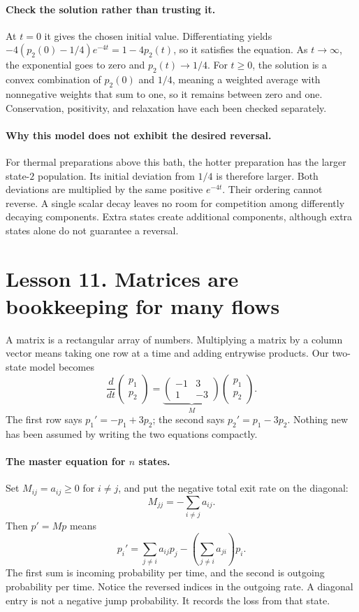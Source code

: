 \documentclass[11pt]{article}
\begin{document}
\paragraph{Check the solution rather than trusting it.}
At $t=0$ it gives the chosen initial value. Differentiating yields
$-4(p_2(0)-1/4)e^{-4t}=1-4p_2(t)$, so it satisfies the equation.
As $t\to\infty$, the exponential goes to zero and $p_2(t)\to1/4$.
For $t\geq0$, the solution is a convex combination of $p_2(0)$ and $1/4$,
meaning a weighted average with nonnegative weights that sum to one,
so it remains between zero and one. Conservation, positivity, and relaxation
have each been checked separately.

\paragraph{Why this model does not exhibit the desired reversal.}
For thermal preparations above this bath, the hotter preparation has the
larger state-$2$ population. Its initial deviation from $1/4$ is therefore
larger. Both deviations are multiplied by the same positive $e^{-4t}$.
Their ordering cannot reverse. A single scalar decay leaves no room for
competition among differently decaying components. Extra states create
additional components, although extra states alone do not guarantee a reversal.

\clearpage
\section*{Lesson 11. Matrices are bookkeeping for many flows}
A matrix is a rectangular array of numbers. Multiplying a matrix by a column
vector means taking one row at a time and adding entrywise products.
Our two-state model becomes
\[
\frac{d}{dt}\begin{pmatrix}p_1\\p_2\end{pmatrix}
=\underbrace{\begin{pmatrix}-1&3\\1&-3\end{pmatrix}}_{M}
\begin{pmatrix}p_1\\p_2\end{pmatrix}.
\]
The first row says $p_1'=-p_1+3p_2$; the second says $p_2'=p_1-3p_2$.
Nothing new has been assumed by writing the two equations compactly.

\paragraph{The master equation for $n$ states.}
Set $M_{ij}=a_{ij}\geq0$ for $i\ne j$, and put the negative total exit rate
on the diagonal:
\[
M_{jj}=-\sum_{i\ne j}a_{ij}.
\]
Then $p'=Mp$ means
\[
p_i'=\sum_{j\ne i}a_{ij}p_j
-\left(\sum_{j\ne i}a_{ji}\right)p_i.
\]
The first sum is incoming probability per time, and the second is outgoing
probability per time. Notice the reversed indices in the outgoing rate.
A diagonal entry is not a negative jump probability. It records the loss
from that state.
\end{document}
